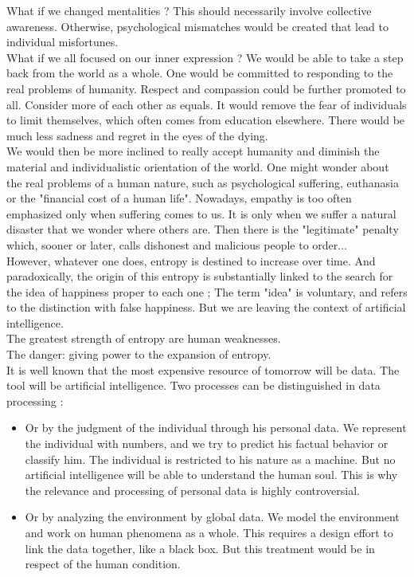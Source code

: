 What if we changed mentalities ? This should necessarily involve collective awareness. Otherwise, psychological mismatches would be created that lead to individual misfortunes.\\

What if we all focused on our inner expression ? We would be able to take a step back from the world as a whole. One would be committed to responding to the real problems of humanity. Respect and compassion could be further promoted to all. Consider more of each other as equals. It would remove the fear of individuals to limit themselves, which often comes from education elsewhere. There would be much less sadness and regret in the eyes of the dying.\\

We would then be more inclined to really accept humanity and diminish the material and individualistic orientation of the world. One might wonder about the real problems of a human nature, such as psychological suffering, euthanasia or the "financial cost of a human life". Nowadays, empathy is too often emphasized only when suffering comes to us. It is only when we suffer a natural disaster that we wonder where others are. Then there is the "legitimate" penalty which, sooner or later, calls dishonest and malicious people to order...\\

However, whatever one does, entropy is destined to increase over time. And paradoxically, the origin of this entropy is substantially linked to the search for the idea of happiness proper to each one ; The term "idea" is voluntary, and refers to the distinction with false happiness. But we are leaving the context of artificial intelligence.\\

The greatest strength of entropy are human weaknesses.\\
The danger: giving power to the expansion of entropy.\\

It is well known that the most expensive resource of tomorrow will be data. The tool will be artificial intelligence. Two processes can be distinguished in data processing :\\
\begin{itemize}
\item Or by the judgment of the individual through his personal data. We represent the individual with numbers, and we try to predict his factual behavior or classify him. The individual is restricted to his nature as a machine. But no artificial intelligence will be able to understand the human soul. This is why the relevance and processing of personal data is highly controversial.
\item Or by analyzing the environment by global data. We model the environment and work on human phenomena as a whole. This requires a design effort to link the data together, like a black box. But this treatment would be in respect of the human condition.\\
\end{itemize}

